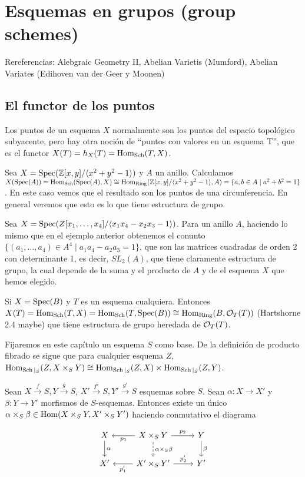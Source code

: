 \documentclass[GA.tex]{subfiles}
\begin{document}

\chapter{Esquemas en grupos (group schemes)}
Rereferencias: Alebgraic Geometry II, Abelian Varietis (Mumford), Abelian Variates (Edihoven van der Geer y Moonen)

\section{El functor de los puntos}
Los puntos de un esquema $X$ normalmente son los puntos del espacio topológico subyacente, pero hay otra noción de ``puntos con valores en un esquema T'', que es el functor $X(T)=h_X(T)=\operatorname{Hom}_{\operatorname{Sch}}(T,X)$. 

\begin{ej}
Sea $X=\operatorname{Spec}(\mathbb{Z}[x,y]/\langle{x^2+y^2-1}\rangle)$ y $A$ un anillo. Calculamos $X(\operatorname{Spec}(A))=\operatorname{Hom}_{\operatorname{Sch}}(\operatorname{Spec}(A),X) \cong\operatorname{Hom}_{\operatorname{Ring}}(\mathbb{Z}[x,y]/\langle{x^2+y^2-1}\rangle,A)=\{a,b\in A\mid a^2+b^2=1\}$. En este caso vemos que el resultado son los puntos de una circunferencia. En general veremos que esto es lo que tiene estructura de grupo. 
\end{ej}
\begin{ej}
Sea $X=\operatorname{Spec}(Z[x_1,\dots, x_4]/\langle{x_1x_4-x_2x_3-1}\rangle)$. Para un anillo $A$, haciendo lo mismo que en el ejemplo anterior obtenemos el conunto $\{(a_1,\dots, a_4)\in A^4\mid a_1a_4-a_2a_3=1\}$, que son las matrices cuadradas de orden 2 con determinante 1, es decir, $SL_2(A)$, que tiene claramente estructura de grupo, la cual depende de la suma y el producto de $A$ y de el esquema $X$ que hemos elegido. 
\end{ej}

\begin{ej}
Si $X=\operatorname{Spec}(B)$ y $T$ es un esquema cualquiera. Entonces $X(T)=\operatorname{Hom}_{\operatorname{Sch}}(T,X)=\operatorname{Hom}_{\operatorname{Sch}}(T,\operatorname{Spec}(B))\cong\operatorname{Hom}_{\operatorname{Ring}}(B,{\mathcal O}_T(T))$ (Hartshorne 2.4 maybe) que tiene estructura de grupo heredada de ${\mathcal O}_T(T)$. 
\end{ej}

Fijaremos en este capítulo un esquema $S$ como base. De la definición de producto fibrado se sigue que para cualquier esquema $Z$, $\operatorname{Hom}_{\operatorname{Sch}|_S}(Z,X\times_S Y)\cong\operatorname{Hom}_{\operatorname{Sch}|_S}(Z,X)\times \operatorname{Hom}_{\operatorname{Sch}|_S}(Z,Y)$. 

\begin{observacion}
Sean $X\xrightarrow{f}S, Y\xrightarrow{g}S$, $X'\xrightarrow{f'}S, Y'\xrightarrow{g'}S$ esquemas sobre $S$. Sean $\alpha:X\to X'$ y $\beta:Y\to Y'$ morfismos de $S$-esquemas. Entonces existe un único $\alpha\times_S\beta\in\operatorname{Hom}(X\times_SY,X'\times_SY')$ haciendo conmutativo el diagrama 

\[
\begin{tikzcd}
X\arrow[d, "\alpha"] & X\times_SY\arrow[l, "p_1"]\arrow[r, "p_2"]\arrow[d, dashed, "\alpha\times_S\beta"] & Y\arrow[d, "\beta"]\\
X' &X'\times_SY'\arrow[l, "p_1'"]\arrow[r, "p_2'"] & Y'
\end{tikzcd}
\]
\end{observacion}
\end{document}
